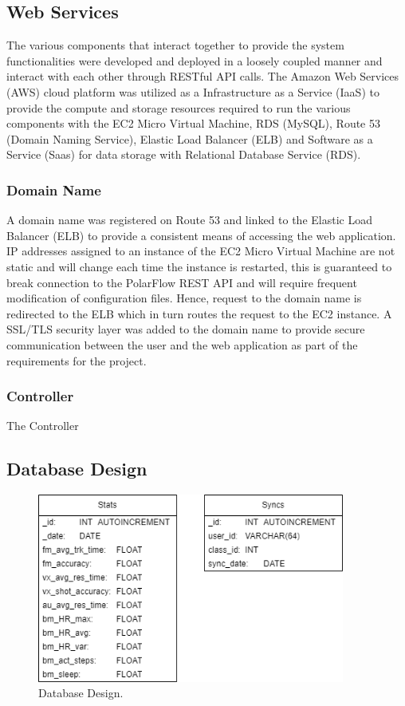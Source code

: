 \subsection{Web Services}
The various components that interact together to provide the system functionalities were developed and deployed in a loosely coupled manner and
interact with each other through RESTful API calls.  The Amazon Web Services (AWS) cloud platform was utilized as a Infrastructure as a Service (IaaS)
to provide the compute and storage resources required to run the various components with the EC2 Micro Virtual Machine, RDS (MySQL), 
Route 53 (Domain Naming Service), Elastic Load Balancer (ELB) and Software as a Service (Saas) for data storage with
Relational Database Service (RDS).

\subsubsection*{Domain Name} A domain name was registered on Route 53 and linked to the Elastic Load Balancer (ELB) to provide a consistent means of 
accessing the web application. IP addresses assigned to an instance of the EC2 Micro Virtual Machine are not static and will change each time the 
instance is restarted, this is guaranteed to break connection to the PolarFlow REST API and will require frequent modification of configuration files. 
Hence, request to the domain name is redirected to the ELB which in turn routes the request to the EC2 instance. A SSL/TLS security layer was added to 
the domain name to provide secure communication between the user and the web application as part of the requirements for the project. 

\subsubsection*{Controller} The Controller
\subsection{Database Design}
\begin{figure}[h!]
    \includegraphics[width=0.9\textwidth]{images/db_schema.png}
    \caption{Database Design.}
    \label{image:databaseDesign}
\end{figure}


